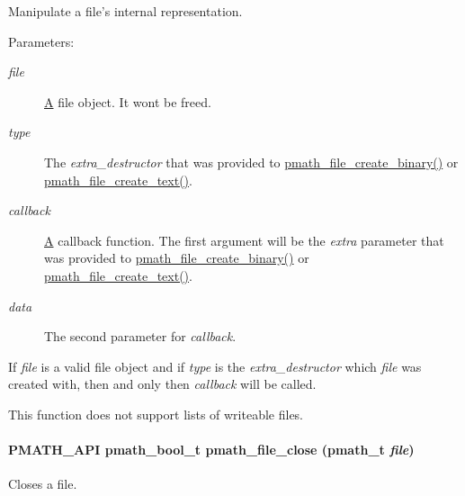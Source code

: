 Manipulate a file's internal representation. 

\begin{Desc}
\item[Parameters:]
\begin{description}
\item[{\em file}]\hyperlink{class_a}{A} file object. It wont be freed. \item[{\em type}]The {\em extra\_\-destructor\/} that was provided to \hyperlink{group__file__api_g121e1c31d32fa30b60c8bb4d0808f4eb}{pmath\_\-file\_\-create\_\-binary()} or \hyperlink{group__file__api_gb8a4394b083543a3e572862d567b4b63}{pmath\_\-file\_\-create\_\-text()}. \item[{\em callback}]\hyperlink{class_a}{A} callback function. The first argument will be the {\em extra\/} parameter that was provided to \hyperlink{group__file__api_g121e1c31d32fa30b60c8bb4d0808f4eb}{pmath\_\-file\_\-create\_\-binary()} or \hyperlink{group__file__api_gb8a4394b083543a3e572862d567b4b63}{pmath\_\-file\_\-create\_\-text()}. \item[{\em data}]The second parameter for {\em callback\/}.\end{description}
\end{Desc}
If {\em file\/} is a valid file object and if {\em type\/} is the {\em extra\_\-destructor\/} which {\em file\/} was created with, then and only then {\em callback\/} will be called.

This function does not support lists of writeable files. \hypertarget{group__file__api_g61142920bd7a8f066af908092c84d8e4}{
\paragraph[{pmath\_\-file\_\-close}]{\setlength{\rightskip}{0pt plus 5cm}PMATH\_\-API {\bf pmath\_\-bool\_\-t} pmath\_\-file\_\-close ({\bf pmath\_\-t} {\em file})}\hfill}
\label{group__file__api_g61142920bd7a8f066af908092c84d8e4}


Closes a file. 

